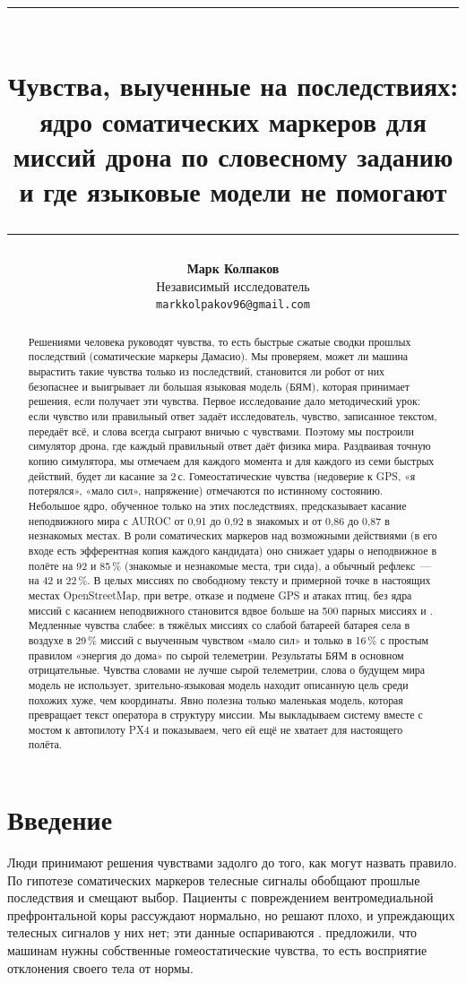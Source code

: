 \documentclass[10pt]{article}
\title{\vspace{-.6em}\rule{\linewidth}{3pt}\\[.55em]\textbf{Чувства, выученные на последствиях:\\ ядро соматических маркеров для миссий дрона по словесному заданию\\ и где языковые модели не помогают}\\[-.15em]\rule{\linewidth}{1pt}}
\author{\textbf{Марк Колпаков}\\ Независимый исследователь\\ \texttt{markkolpakov96@gmail.com}}
\date{}
\begin{document}
\maketitle
\thispagestyle{fancy}

\begin{abstract}
Решениями человека руководят чувства, то есть быстрые сжатые сводки прошлых последствий (соматические маркеры Дамасио).
Мы проверяем, может ли машина вырастить такие чувства только из последствий, становится ли робот от них безопаснее и
выигрывает ли большая языковая модель (БЯМ), которая принимает решения, если получает эти чувства. Первое исследование дало
методический урок: если чувство или правильный ответ задаёт исследователь, чувство, записанное текстом, передаёт всё, и слова
всегда сыграют вничью с чувствами. Поэтому мы построили симулятор дрона, где каждый правильный ответ даёт физика мира.
Раздваивая точную копию симулятора, мы отмечаем для каждого момента и для каждого из семи быстрых действий, будет ли касание за
2\,с. Гомеостатические чувства (недоверие к GPS, «я потерялся», «мало сил», напряжение) отмечаются по истинному состоянию.
Небольшое ядро, обученное только на этих последствиях, предсказывает касание неподвижного мира с AUROC от 0,91 до 0,92 в знакомых
и от 0,86 до 0,87 в незнакомых местах. В роли соматических маркеров над возможными действиями (в его входе есть эфферентная копия
каждого кандидата) оно снижает удары о неподвижное в полёте на 92 и 85\,\% (знакомые и незнакомые места, три сида), а обычный
рефлекс~--- на 42 и 22\,\%. В целых миссиях по свободному тексту и примерной точке в настоящих местах OpenStreetMap, при ветре,
отказе и подмене GPS и атаках птиц, без ядра миссий с касанием неподвижного становится вдвое больше на 500 парных миссиях и
\GTWOREPL. Медленные чувства слабее: в тяжёлых миссиях со слабой батареей батарея села в воздухе в 29\,\% миссий с
выученным чувством «мало сил» и только в 16\,\% с простым правилом «энергия до дома» по сырой телеметрии. Результаты БЯМ в
основном отрицательные. Чувства словами не лучше сырой телеметрии, слова о будущем мира модель
не использует, зрительно-языковая модель находит описанную цель среди похожих хуже, чем координаты. Явно полезна только
маленькая модель, которая превращает текст оператора в структуру миссии. Мы выкладываем систему вместе с мостом к автопилоту
PX4 и показываем, чего ей ещё не хватает для настоящего полёта.
\end{abstract}

\section{Введение}
Люди принимают решения чувствами задолго до того, как могут назвать правило. По гипотезе соматических маркеров
\citep{damasio1994,bechara1994,bechara1997} телесные сигналы обобщают прошлые последствия и смещают выбор. Пациенты с повреждением
вентромедиальной префронтальной коры рассуждают нормально, но решают плохо, и упреждающих телесных сигналов у них нет; эти
данные оспариваются \citep{dunn2006}. \citet{man2019} предложили, что машинам нужны собственные гомеостатические чувства,
то есть восприятие отклонения своего тела от нормы.
\end{document}
